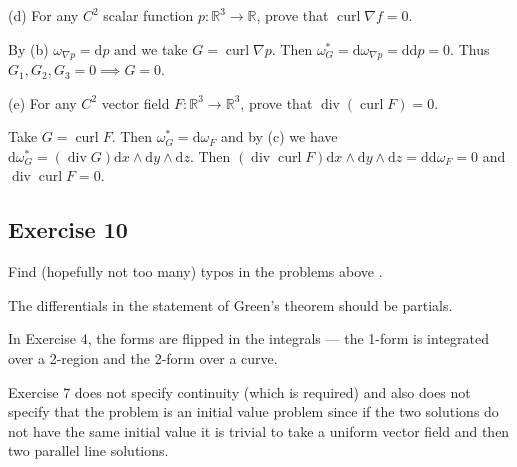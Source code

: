 \documentclass{amsart}
\newcommand{\R}{\mathbb R}
\newcommand{\dd}{\mathrm d}
\DeclareMathOperator{\curl}{curl}
\DeclareMathOperator{\dv}{div}
\begin{document}
(d) For any $C^2$ scalar function $p : \R^3 \to \R$, prove that $\curl \nabla f = 0$.

\medskip \noindent By (b) $\omega_{\nabla p}=\dd p$ and we take $G=\curl\nabla p$. 
Then $\omega^*_G=\dd\omega_{\nabla p}=\dd\dd p = 0$. Thus $G_1, G_2, G_3=0\implies G=0$. 

\bigskip

(e) For any $C^2$ vector field $F : \R^3 \to \R^3$, prove that $\dv (\curl F) = 0$.

\medskip \noindent Take $G = \curl F$. Then $\omega^*_G = \dd\omega_F$ and by (c)
we have $\dd\omega_G^*=(\dv G)\dd x\wedge\dd y\wedge\dd z$. Then 
$(\dv\curl F)\dd x\wedge\dd y\wedge\dd z = \dd\dd\omega_F=0$ and $\dv\curl F=0$.

\bigskip

\subsection*{Exercise 10} Find (hopefully not too many) typos in the problems above {\em \smiley}.

\medskip \noindent The differentials in the statement of Green's theorem should be partials. 

\medskip \noindent In Exercise 4, the forms are flipped in the integrals — the 1-form is integrated over a
2-region and the 2-form over a curve.

\medskip \noindent Exercise 7 does not specify continuity (which is required) and also does not specify that the problem
is an initial value problem since if the two solutions do not have the same initial value it is trivial
to take a uniform vector field and then two parallel line solutions. 
\end{document}
